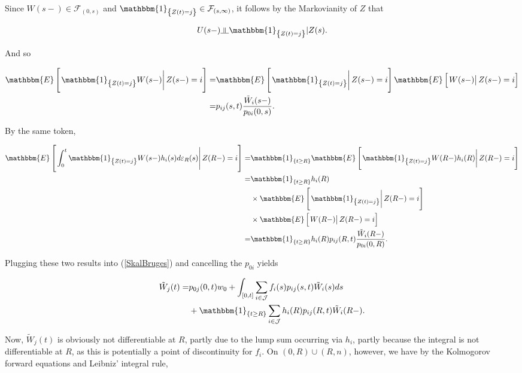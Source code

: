 \documentclass{article}
\newcommand{\indep}{\rotatebox[origin=c]{90}{$\models$}}
\newcommand{\1}[1]{\mathbbm{1}_{\left\lbrace #1 \right\rbrace}}
\newcommand{\econd}[2][def]{\mathbbm{E} \left[ \left. #1 \right| #2 \right]}
\theoremstyle{break}
\theoremstyle{remark}
\numberwithin{equation}{section}
\begin{document}
Since $W(s-) \in  \mathcal{F}_{\left( 0,s \right)}$ and $\1{Z(t)=j} \in \mathcal{F}_{\left( s,\infty \right)}$, it follows by the Markovianity of $Z$ that

\begin{align*}
	U(s-) \indep \1{Z(t)=j} | Z(s).
\end{align*}

And so 

\begin{align*}
	\econd[\1{Z(t)=j}W(s-)]{Z(s-)=i} =& \econd[\1{Z(t)=j}]{Z(s-)=i} \econd[W(s-)]{Z(s-)=i} \\
	=& p_{ij}(s,t) \frac{\tilde{W}_i(s-)}{p_{0i}(0,s)}.
\end{align*}

By the same token,

\begin{align*}
	\econd[\int_0^t \1{Z(t)=j} W(s-) h_{i}(s) d \varepsilon_{R}(s)]{Z(R-)=i} =& \1{t \geq R} \econd[\1{Z(t)=j} W(R-) h_{i}(R)]{Z(R-)=i} \\
	=& \1{t \geq R} h_{i}(R) \\
	&\times \econd[\1{Z(t)=j}]{Z(R-)=i} \\
	&\times \econd[W(R-)]{Z(R-)=i} \\
	=& \1{t \geq R} h_{i}(R) p_{ij}(R,t) \frac{\tilde{W}_i(R-)}{p_{0i}(0,R)}.
\end{align*}

Plugging these two results into (\ref{SkalBruges}) and cancelling the $p_{0i}$ yields

\begin{align} \label{Brug}
\begin{split}
		\tilde{W}_j(t) =& p_{0j}(0,t) w_0 + \int_{\left[ 0,t \right]} \sum_{i \in \mathcal{J}} f_{i}(s) p_{ij}(s,t) \tilde{W}_i(s) ds \\
	&+ \1{t \geq R} \sum_{i \in \mathcal{J}} h_{i}(R) p_{ij}(R,t) \tilde{W}_i(R-).
\end{split}
\end{align}

Now, $\tilde{W}_j(t)$ is obviously not differentiable at $R$, partly due to the lump sum occurring via $h_i$, partly because the integral is not differentiable at $R$, as this is potentially a point of discontinuity for $f_i$. On $(0,R)\cup(R,n)$, however, we have by the Kolmogorov forward equations and Leibniz' integral rule,
\end{document}
